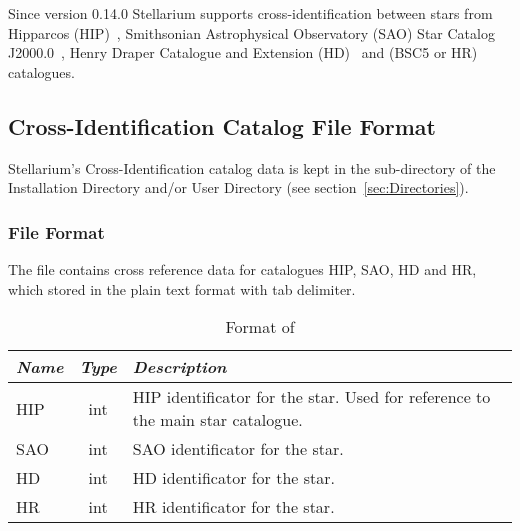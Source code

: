 Since version 0.14.0 Stellarium supports cross-identification between stars from 
Hipparcos (HIP)~\citep{2012AstL...38..331A}, 
Smithsonian Astrophysical Observatory (SAO) Star Catalog J2000.0~\citep{1995yCat.1131....0S}, Henry Draper Catalogue and Extension (HD)~\citep{1993yCat.3135....0C} and 
  (BSC5 or HR) %
catalogues.

\subsection{Cross-Identification Catalog File Format}
\label{sec:StarCatalogues:CrossIdentificationData:format}


Stellarium's Cross-Identification catalog data is kept
in the  sub-directory of the Installation Directory and/or User Directory (see section~\ref{sec:Directories}).

\subsubsection{File Format}
\label{sec:StarCatalogues:CrossIdentificationData:file}

The file  contains cross reference data for catalogues HIP, SAO, HD and HR, which stored in the plain text format with tab delimiter.

\begin{table}[htb]
\begin{tabularx}{\textwidth}{l|c|X}\toprule
\emph{Name} & \emph{Type} & \emph{Description}\\\midrule
HIP	& int & HIP identificator for the star. Used for reference to the main star catalogue.\\%
SAO	& int & SAO identificator for the star.\\%
HD	& int & HD identificator for the star.\\%
HR	& int & HR identificator for the star.\\\bottomrule
\end{tabularx}
\caption{Format of }
\label{tab:StarCatalogues:CrossIdentificationData:file}
\end{table}


